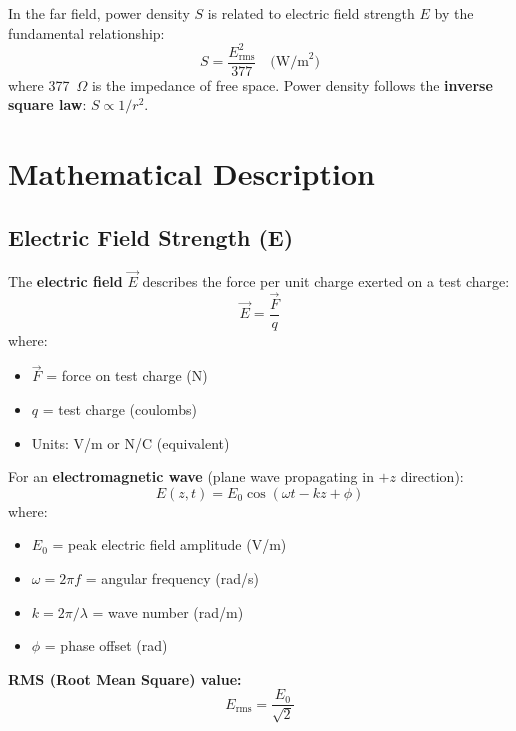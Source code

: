 \begin{keyconcept}
In the far field, power density $S$ is related to electric field strength $E$ by the fundamental relationship:
\[
S = \frac{E_{\text{rms}}^2}{377} \quad \text{(W/m}^2\text{)}
\]
where 377~$\Omega$ is the impedance of free space. Power density follows the \textbf{inverse square law}: $S \propto 1/r^2$.
\end{keyconcept}

\section{Mathematical Description}

\subsection{Electric Field Strength (E)}

The \textbf{electric field} $\vec{E}$ describes the force per unit charge exerted on a test charge:
\begin{equation}
\vec{E} = \frac{\vec{F}}{q}
\label{eq:efield-definition}
\end{equation}
where:
\begin{itemize}
\item $\vec{F}$ = force on test charge (N)
\item $q$ = test charge (coulombs)
\item Units: V/m or N/C (equivalent)
\end{itemize}

For an \textbf{electromagnetic wave} (plane wave propagating in $+z$ direction):
\begin{equation}
E(z,t) = E_0 \cos(\omega t - kz + \phi)
\label{eq:efield-wave}
\end{equation}
where:
\begin{itemize}
\item $E_0$ = peak electric field amplitude (V/m)
\item $\omega = 2\pi f$ = angular frequency (rad/s)
\item $k = 2\pi/\lambda$ = wave number (rad/m)
\item $\phi$ = phase offset (rad)
\end{itemize}

\textbf{RMS (Root Mean Square) value:}
\begin{equation}
E_{\text{rms}} = \frac{E_0}{\sqrt{2}}
\label{eq:efield-rms}
\end{equation}

